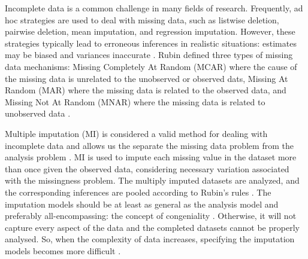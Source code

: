 \documentclass[10pt, a4paper, titlepage]{article}
\begin{document}
Incomplete data is a common challenge in many fields of research. Frequently, ad hoc strategies are used to deal with missing data, such as listwise deletion, pairwise deletion, mean imputation, and regression imputation. However, these strategies typically lead to erroneous inferences in realistic situations: estimates may be biased and variances inaccurate \citep{buurenFlexibleImputationMissing2018, kang2013, enders2017, austin2021}. Rubin defined three types of missing data mechanisms: Missing Completely At Random (MCAR) where the cause of the missing data is unrelated to the unobserved or observed dats, Missing At Random (MAR) where the missing data is related to the observed data, and Missing Not At Random (MNAR) where the missing data is related to unobserved data \citep{rubin1976}.

Multiple imputation (MI) is considered a valid method for dealing with incomplete data and allows us the separate the missing data problem from the analysis problem \citep{mistlerComparisonJointModel2017, buurenFlexibleImputationMissing2018, enders2017, burgette2010, austin2021, audigier2018, vanbuuren2007, grund2021, hughes2014}. MI is used to impute each missing value in the dataset more than once given the observed data, considering necessary variation associated with the missingness problem. The multiply imputed datasets are analyzed, and the corresponding inferences are pooled according to Rubin's rules \citep{buurenFlexibleImputationMissing2018, austin2021, rubin1987, carpenter2013}. The imputation models should be at least as general as the analysis model and preferably all-encompassing: the concept of congeniality \citep{grund2018, enders2018, meng1994multiple, bartlett2015, grund2016}. Otherwise, it will not capture every aspect of the data and the completed datasets cannot be properly analysed. So, when the complexity of data increases, specifying the imputation models becomes more difficult \citep{grund2018, buurenFlexibleImputationMissing2018}.
\end{document}
